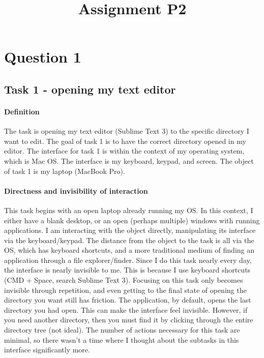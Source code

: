 

\title{Assignment P2\\}



\maketitle
\thispagestyle{fancy}

\section{Question 1}

\subsection{Task 1 - opening my text editor}

\paragraph{Definition}

The task is opening my text editor (Sublime Text 3) to the specific directory I want to edit. The goal of task 1 is to have the correct directory opened in my editor. The interface for task 1 is within the context of my operating system, which is Mac OS. The interface is my keyboard, keypad, and screen. The object of task 1 is my laptop (MacBook Pro).

\paragraph{Directness and invisibility of interaction}
This task begins with an open laptop already running my OS. In this context, I either have a blank desktop, or an open (perhaps multiple) windows with running applications. I am interacting with the object directly, manipulating its interface via the keyboard/keypad. The distance from the object to the task is all via the OS, which has keyboard shortcuts, and a more traditional medium of finding an application through a file explorer/finder. Since I do this task nearly every day, the interface is nearly invisible to me. This is because I use keyboard shortcuts (CMD + Space, search Sublime Text 3). Focusing on this task only becomes invisible through repetition, and even getting to the final state of opening the directory you want still has friction. The application, by default, opens the last directory you had open. This can make the interface feel invisible. However, if you need another directory, then you must find it by clicking through the entire directory tree (not ideal). The number of actions necessary for this task are minimal, so there wasn't a time where I thought about the subtasks in this interface significantly more.


